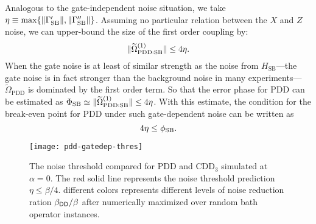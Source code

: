 \documentclass[pra,reprint,superscriptaddress]{revtex4-2}
\newcommand{\ep}{\Phi_\mathrm{SB}}
\begin{document}
Analogous to the gate-independent noise situation, we take $\eta\equiv \max\{\Vert \Gamma'_{\mathrm{SB}} \Vert,\Vert \Gamma''_{\mathrm{SB}}\Vert\}$. Assuming no particular relation between the $X$ and $Z$ noise,  we can upper-bound the size of the first order coupling by:
\begin{equation}\label{eq:gatedep-upperbound}
\Vert { \widetilde{\Omega}_\mathrm{PDD:SB}^{(1)} } \Vert \le 4 \eta.
\end{equation}
When the gate noise is at least of similar strength as the noise from $H_\mathrm{SB}$---the gate noise is in fact stronger than the background noise in many experiments---$\widetilde{\Omega}_\mathrm{PDD}$ is dominated by the first order term. So that the error phase for PDD can be estimated as $\ep\simeq \norm{ \widetilde{\Omega}_\mathrm{PDD:SB}^{(1)} } \leq 4\eta$.
With this estimate, the condition for the break-even point for PDD under such gate-dependent noise can be written as 
\begin{equation}
4\eta\leq\phi_{\mathrm{SB}}.
\end{equation}

 \begin{figure}
\texttt{[image: pdd-gatedep-thres]}
\caption{The noise threshold compared for PDD and $\mathrm{CDD}_3$ simulated at $\alpha=0$. The red solid line represents the noise threshold prediction $\eta\le\beta/4$. different colors represents different levels of noise reduction ration $\beta_{\mathsf{DD}}/\beta$ after numerically maximized over random bath operator instances.
\label{fig:cdd-gatedep-thres}}
\end{figure}

\end{document}
